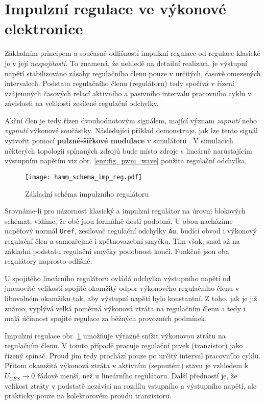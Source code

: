   \section{Impulzní regulace ve výkonové elektronice}\label{ENZ:kap_Imp_Reg}
    Základním principem a současně odlišností impulzní regulace od regulace klasické je v její
    \emph{nespojitosti}. To znamená, že nehledě na detailní realizaci, je výstupní napětí 
    stabilizováno zásahy regulačního členu pouze v určitých, časově omezených intervalech. Podstata 
    regulačního členu (regulátoru) tedy spočívá v řízení vzájemných časových relací aktivního a 
    pasivního intervalu pracovního cyklu v závislosti na velikosti zesílené regulační odchylky.
    
    Akční člen je tedy řízen dvouhodnotovým signálem, mající význam \emph{zapnutí} nebo 
    \emph{vypnutí} výkonové součástky. Následující příklad demonstruje, jak lze tento signál 
    vytvořit pomocí \textbf{pulzně-šířkové modulace} v simulátoru \ltLtspiceSW. V simulacích 
    některých topologií spínaných zdrojů bude místo zdroje s lineárně narůstajícím výstupním napětím 
    viz obr. \ref{enz:fig_pwm_wave} použita regulační odchylka.
    
    \begin{figure}[ht!]
      \centering
      \texttt{[image: hamm\_schema\_imp\_reg.pdf]}
      \caption[Schéma impulzního regulátoru]{Základní schéma impulzního regulátoru}
      \label{enz:fig_imp_reg_basic}
    \end{figure}
    
    Srovnáme-li pro názornost klasický a impulzní regulátor na úrovni blokových schémat, vidíme, že 
    obě jsou formálně dosti podobná. U obou nacházíme napěťový normál \texttt{Uref}, zesilovač 
    regulační odchylky \texttt{Au}, budící obvod i výkonový regulační člen a samozřejmě i 
    zpětnovazební smyčku. Tím však, snad až na základní podstatu regulační smyčky podobnost končí. 
    Funkčně jsou oba regulátory naprosto odlišné.
    
    U spojitého lineárního regulátoru ovládá odchylka výstupního napětí od jmenovité velikosti 
    spojitě okamžitý odpor výkonového regulačního členu v libovolném o\-kam\-ži\-ku tak, aby 
    výstupní napětí bylo konstantní. Z toho, jak je již známo, vyplývá velká poměrná výkonová ztráta 
    na regulačním členu a tedy i malá účinnost spojité regulace za běžných provozních podmínek.
    
    Impulzní regulace obr. \ref{enz:fig_imp_reg_basic} umožňuje výrazně snížit výkonovou ztrátu na
    regulačním členu. V tomto případě pracuje regulační prvek (tranzistor) jako řízený spínač. Proud 
    jím tedy prochází pouze po určitý interval pracovního cyklu. Přitom okamžitá výkonová ztráta v 
    aktivním (sepnutém) stavu je vzhledem k $U_{CES}\rightarrow 0$ řádově menší, než u lineárního 
    regulátoru. Další předností je, že velikost ztráty v podstatě nezávisí na rozdílu vstupního a 
    výstupního napětí, ale prakticky pouze na kolektorovém proudu tranzistoru.
    
